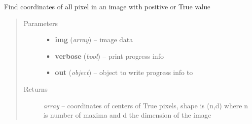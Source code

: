 \documentclass[letterpaper,10pt,english]{sphinxmanual}
\begin{document}

\begin{fulllineitems}
\label{api/ClearMap.ImageProcessing:ClearMap.ImageProcessing.MaximaDetection.findPixelCoordinates}
Find coordinates of all pixel in an image with positive or True value
\begin{quote}\begin{description}
\item[{Parameters}] \leavevmode\begin{itemize}
\item {} 
\textbf{img} (\emph{array}) --
image data

\item {} 
\textbf{verbose} (\emph{bool}) --
print progress info

\item {} 
\textbf{out} (\emph{object}) --
object to write progress info to

\end{itemize}

\item[{Returns}] \leavevmode
\emph{array} --
coordinates of centers of True pixels, shape is (n,d)  where n is number of maxima and d the dimension of the image

\end{description}\end{quote}

\end{fulllineitems}

\end{document}

